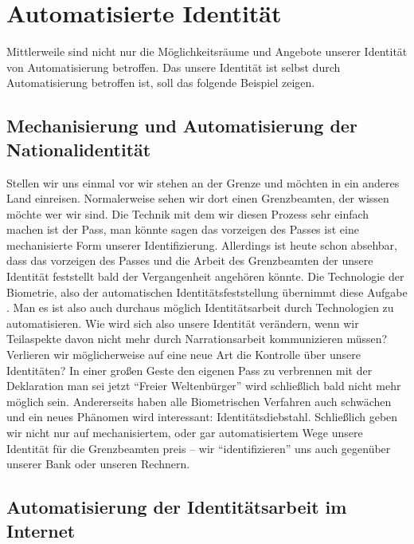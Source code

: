 \section {Automatisierte Identität}

Mittlerweile sind nicht nur die Möglichkeitsräume und Angebote unserer Identität von Automatisierung betroffen.
Das unsere Identität ist selbst durch Automatisierung betroffen ist, soll das folgende Beispiel zeigen.

\subsection {Mechanisierung und Automatisierung der Nationalidentität}

Stellen wir uns einmal vor wir stehen an der Grenze und möchten in ein anderes Land einreisen.
Normalerweise sehen wir dort einen Grenzbeamten, der wissen möchte wer wir sind.
Die Technik mit dem wir diesen Prozess sehr einfach machen ist der Pass, man könnte sagen das vorzeigen des Passes ist eine mechanisierte Form unserer Identifizierung.
Allerdings ist heute schon absehbar, dass das vorzeigen des Passes und die Arbeit des Grenzbeamten der unsere Identität feststellt bald der Vergangenheit angehören könnte.
Die Technologie der Biometrie, also der automatischen Identitätsfeststellung übernimmt diese Aufgabe \parencite{knaut}.
Man es ist also auch durchaus möglich Identitätsarbeit durch Technologien zu automatisieren.
Wie wird sich also unsere Identität verändern, wenn wir Teilaspekte davon nicht mehr durch Narrationsarbeit kommunizieren müssen?
Verlieren wir möglicherweise auf eine neue Art die Kontrolle über unsere Identitäten?
In einer großen Geste den eigenen Pass zu verbrennen mit der Deklaration man sei jetzt \enquote{Freier Weltenbürger} wird schließlich bald nicht mehr möglich sein.
Andererseits haben alle Biometrischen Verfahren auch schwächen und ein neues Phänomen wird interessant: Identitätsdiebstahl. 
Schließlich geben wir nicht nur auf mechanisiertem, oder gar automatisiertem Wege unsere Identität für die Grenzbeamten preis – wir \enquote{identifizieren} uns auch gegenüber unserer Bank oder unseren Rechnern.

\subsection {Automatisierung der Identitätsarbeit im Internet}

